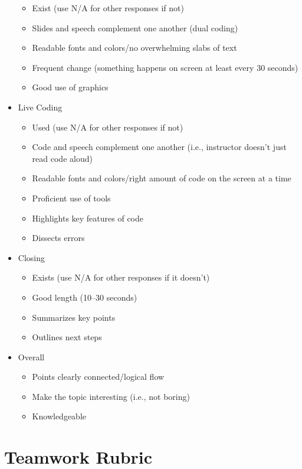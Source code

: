 \begin{itemize}
  \begin{itemize}
  \tightlist
  \item
    Exist (use N/A for other responses if not)
  \item
    Slides and speech complement one another (dual coding)
  \item
    Readable fonts and colors/no overwhelming slabs of text
  \item
    Frequent change (something happens on screen at least every 30 seconds)
  \item
    Good use of graphics
  \end{itemize}
\item
  Live Coding

  \begin{itemize}
  \tightlist
  \item
    Used (use N/A for other responses if not)
  \item
    Code and speech complement one another (i.e., instructor doesn't just read code aloud)
  \item
    Readable fonts and colors/right amount of code on the screen at a time
  \item
    Proficient use of tools
  \item
    Highlights key features of code
  \item
    Dissects errors
  \end{itemize}
\item
  Closing

  \begin{itemize}
  \tightlist
  \item
    Exists (use N/A for other responses if it doesn't)
  \item
    Good length (10--30 seconds)
  \item
    Summarizes key points
  \item
    Outlines next steps
  \end{itemize}
\item
  Overall

  \begin{itemize}
  \tightlist
  \item
    Points clearly connected/logical flow
  \item
    Make the topic interesting (i.e., not boring)
  \item
    Knowledgeable
  \end{itemize}
\end{itemize}

\chapter{Teamwork Rubric}\label{s:peereval}

